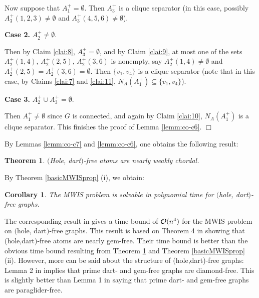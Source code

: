 \documentclass[11pt]{article}
\newcommand{\qed}{\hfill $\Box$}
\newcommand{\0}{\text{ has a co-join to }}
\newcommand{\1}{\text{ has a join to }}
\newtheorem{theo}{Theorem}
\newtheorem{coro}{Corollary}
\begin{document}
Now suppose that $A_1^+ = \emptyset$. Then $A_3^+$ is a clique separator (in this case, possibly $A_3^+(1,2,3) \neq \emptyset$ and $A_3^+(4,5,6) \neq \emptyset$).

\medskip

\noindent
{\bf Case 2.} $A_2^+ \neq \emptyset$. 

\medskip

Then by Claim \ref{clai:8}, $A_3^+ = \emptyset$, and by Claim \ref{clai:9}, at most one of the sets $A_2^+(1,4)$, $A_2^+(2,5)$, $A_2^+(3,6)$ is nonempty, say $A_2^+(1,4) \neq \emptyset$ and $A_2^+(2,5) = A_2^+(3,6) = \emptyset$. Then $\{v_1,v_4\}$ is a clique separator (note that in this case, by Claims \ref{clai:7} and \ref{clai:11}, $N_A(A_1^+) \subseteq \{v_1,v_4\}$).

\medskip
\noindent
{\bf Case 3.} $A_2^+ \cup A_3^+ = \emptyset$. 

\medskip

Then $A_1^+ \neq \emptyset$ since $G$ is connected, and again by Claim \ref{clai:10}, $N_A(A_1^+)$ is a clique separator.
This finishes the proof of Lemma \ref{lemm:co-c6}.             
\qed

\medskip

By Lemmas \ref{lemm:co-c7} and \ref{lemm:co-c6}, one obtains the following result:

\begin{theo}\label{holedartnearlywc}
$($Hole, dart$)$-free atoms are nearly weakly chordal.
\end{theo}

By Theorem \ref{basicMWISprop} (i), we obtain:

\begin{coro}
The MWIS problem is solvable in polynomial time for $($hole, dart$)$-free graphs.
\end{coro}

The corresponding result in \cite{BasChaKar2012} gives a time bound of ${\cal O}(n^4)$ for the MWIS problem on $($hole, dart$)$-free graphs. This result is based on Theorem 4 in \cite{BasChaKar2012} showing that (hole,dart)-free atoms are nearly gem-free. Their time bound is better than the obvious time bound resulting from Theorem \ref{holedartnearlywc} and Theorem \ref{basicMWISprop} (ii). However, more can be said about the structure of (hole,dart)-free graphs: Lemma 2 in \cite{Brand2004} implies that prime dart- and gem-free graphs are diamond-free. This is slightly better than Lemma 1 in \cite{BasChaKar2012} saying that prime dart- and gem-free graphs are paraglider-free.  
\end{document}
